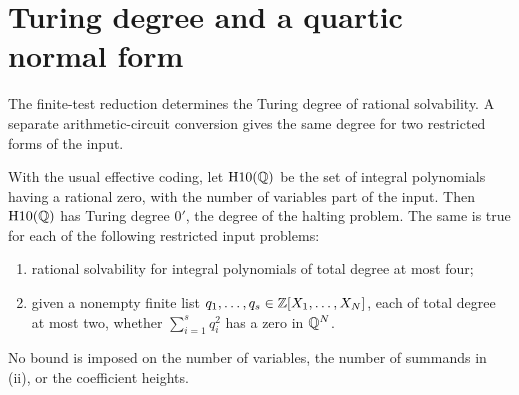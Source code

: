 \section{Turing degree and a quartic normal form}
\label{red:degree-normal-form}

The finite-test reduction determines the Turing degree of rational
solvability. A separate arithmetic-circuit conversion gives the same
degree for two restricted forms of the input.

\begin{corollary}\label{thm:degree-normal-form}
With the usual effective coding, let \(\mathrm{H10}(\mathbb Q)\) be the set of
integral polynomials having a rational zero, with the number of variables
part of the input. Then \(\mathrm{H10}(\mathbb Q)\) has Turing degree \(0'\),
the degree of the halting problem. The same is true for each of the
following restricted input problems:
\begin{enumerate}[label=(\roman*),leftmargin=*]
\item rational solvability for integral polynomials of total degree at
most four;
\item given a nonempty finite list
\(q_1,\ldots,q_s\in\mathbb Z[X_1,\ldots,X_N]\), each of total degree at most
two, whether \(\sum_{i=1}^s q_i^2\) has a zero in \(\mathbb Q^N\).
\end{enumerate}
No bound is imposed on the number of variables, the number of summands
in (ii), or the coefficient heights.
\end{corollary}

